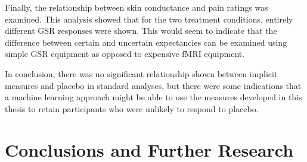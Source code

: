 
Finally, the relationship between skin conductance and pain ratings was examined. This analysis showed that for the two treatment conditions, entirely different GSR responses were shown. This would seem to indicate that the difference between certain and uncertain expectancies can be examined using simple GSR equipment as opposed to expensive fMRI equipment. 

In conclusion, there was no significant relationship shown between implicit measures and placebo in standard analyses, but there were some indications that a machine learning approach might be able to use the measures developed in this thesis to retain participants who were unlikely to respond to placebo. 

\section{Conclusions and Further Research}

